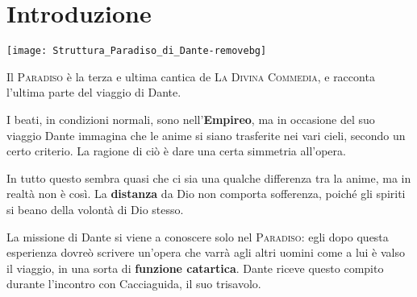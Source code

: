 \documentclass[a4paper, twoside, titlepage]{book}
\newcommand{\titolo}[1]{\textsc{#1}}
\newcounter{mar}
\newcommand{\mar}[2]{
\addtocounter{mar}{1}
\hspace{-0.73em}\textsuperscript{\hyperref[\thechapter.\themar]{\themar}}\marginpar{\textbf{\themar}\label{\thechapter.\themar}. #2}\hspace{-0.4em}
}
\newcommand{\mat}[1]{\mar{gg}{#1}}
\begin{document}
	
	\begin{frontespizio}
		
	\end{frontespizio}
	
% 
%
%
	
	\chapter*{Introduzione}
	
	\begin{center}
		\texttt{[image: Struttura\_Paradiso\_di\_Dante-removebg]}
	\end{center}
	
	Il \titolo{Paradiso} è la terza e ultima cantica de \titolo{La Divina Commedia}, e racconta l'ultima parte del viaggio di Dante.
	
	I beati, in condizioni normali, sono nell'\textbf{Empireo}, ma in occasione del suo viaggio Dante immagina che le anime si siano trasferite nei vari cieli, secondo un certo criterio. La ragione di ciò è dare una certa simmetria all'opera.
	
	In tutto questo sembra quasi che ci sia una qualche differenza tra la anime, ma in realtà non è così. La \textbf{distanza} da Dio non comporta sofferenza, poiché gli spiriti si beano della volontà di Dio stesso.
	
	La missione di Dante si viene a conoscere solo nel \titolo{Paradiso}: egli dopo questa esperienza dovreò scrivere un'opera che varrà agli altri uomini come a lui è valso il viaggio, in una sorta di \textbf{funzione catartica}. Dante riceve questo compito durante l'incontro con Cacciaguida, il suo trisavolo.
	
\end{document}
